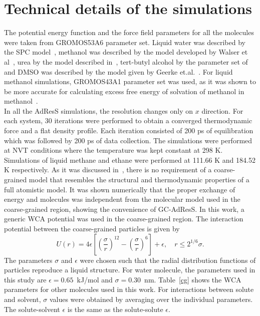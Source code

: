 \documentclass[a4paper,preprint,unsortedaddress]{revtex4-1}
\newcommand{\recheck}[1]{{\color{red} #1}}
\begin{document}
\appendix
\section{Technical details of the simulations}\label{app:tmp1}
The potential energy function and the force field parameters for all the molecules
were taken from GROMOS53A6 parameter set. Liquid water was described by the SPC
model~\cite{spc}, methanol was described by the model developed by Walser et al~\cite{walser},
urea by the model described in~\cite{urea}, tert-butyl alcohol by the parameter set of~\cite{nico}
and DMSO was described by the model given by Geerke et.al.~\cite{dmso1}. For liquid methanol simulations, 
GROMOS43A1 parameter set was used, as it was shown to be more accurate for calculating excess free energy of 
solvation of methanol in methanol~\cite{vang}. \\

In all the AdResS simulations, the resolution changes only on $x$ direction.
For each system, 30 iterations were performed to obtain a 
converged thermodynamic force and a flat density profile. Each iteration consisted 
of 200 ps of equilibration which was followed by 200 ps of data collection. 
The simulations were performed at NVT conditions where the temperature was kept constant 
at 298 K. Simulations of liquid methane and ethane were performed at
111.66 K and 184.52 K respectively. \recheck{As it was discussed in~\cite{prx}, there is no requirement 
of a coarse-grained model that resembles the structural and thermodynamic properties of a full atomistic
model. It was shown numerically that the proper exchange of energy and molecules was independent from the 
molecular model used in the coarse-grained region, showing the convenience of GC-AdResS. In this work, a generic WCA potential was used in the 
coarse-grained region. The interaction potential between the coarse-grained particles is given by 
\begin{equation}
  U(r) = 4 \epsilon \left[\left(\frac{\sigma}{r}\right)^{12} - \left(\frac{\sigma}{r}\right)^{6}\right] + \epsilon,
  \quad
  r \leq 2^{1/6}\sigma. 
\end{equation}
The parameters $\sigma$ and $\epsilon$ were chosen such that the radial distribution functions of particles 
reproduce a liquid structure. For water molecule, the parameters used in this study are $\epsilon=0.65$~kJ/mol
and $\sigma=0.30$~nm. Table~\ref{cg} shows the WCA parameters for other molecules used in this work.
For interactions between solute and solvent, $\sigma$ values were obtained by 
averaging over the individual parameters.
The solute-solvent $\epsilon$ is the same as the solute-solute  $\epsilon$.
\\
}
\end{document}
